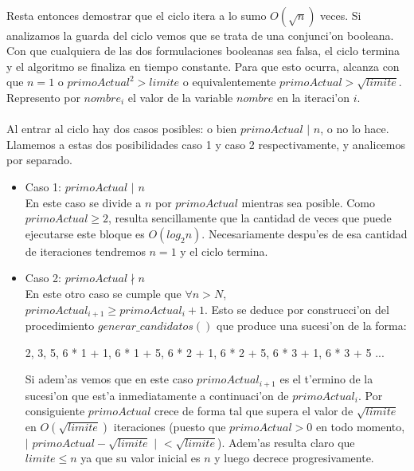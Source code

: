 \paragraph{}
Resta entonces demostrar que el ciclo itera a lo sumo $O(\sqrt{n})$ veces. Si analizamos la guarda del ciclo vemos
que se trata de una conjunci'on booleana. Con que cualquiera de las dos formulaciones booleanas sea falsa, el ciclo
termina y el algoritmo se finaliza en tiempo constante. Para que esto ocurra, alcanza con que $n = 1$ o $primoActual^2
> limite$ o equivalentemente $primoActual > \sqrt{limite}$. Represento por $nombre_i$ el valor de la variable $nombre$ 
en la iteraci'on $i$. 

\paragraph{}
Al entrar al ciclo hay dos casos posibles: o bien $primoActual$ $|$ $n$, o no lo hace. Llamemos a estas dos
posibilidades caso 1 y caso 2 respectivamente, y analicemos por separado.
\begin{itemize}
\item Caso 1: $primoActual$ $|$ $n$ \\
En este caso se divide a $n$ por $primoActual$ mientras sea posible. Como $primoActual \geq 2$, resulta
sencillamente que la cantidad de veces que puede ejecutarse este bloque es $O(log_2 n)$. Necesariamente
despu'es de esa cantidad de iteraciones tendremos $n = 1$ y el ciclo termina.
\item Caso 2: $primoActual \nmid n$\\
En este otro caso se cumple que $\forall n > N$, $primoActual_{i+1} \geq primoActual_i + 1$. Esto se deduce
por construcci'on del procedimiento $generar\_candidatos()$ que produce una sucesi'on de la forma: \\

\centerline{2, 3, 5, 6 * 1 + 1, 6 * 1 + 5, 6 * 2 + 1, 6 * 2 + 5, 6 * 3 + 1, 6 * 3 + 5 ...} 

Si adem'as vemos que en este caso $primoActual_{i+1}$ es el t'ermino de la sucesi'on que est'a 
inmediatamente a continuaci'on de $primoActual_i$. Por consiguiente $primoActual$ crece
de forma tal que supera el valor de $\sqrt{limite}$ en $O(\sqrt{limite})$ iteraciones (puesto
que $primoActual > 0$ en todo momento, $|$ $primoActual - \sqrt{limite}$ $|$ $< \sqrt{limite}$).
Adem'as resulta claro que $limite \leq n$ ya que su valor inicial es $n$ y luego decrece
progresivamente.
\end{itemize}

